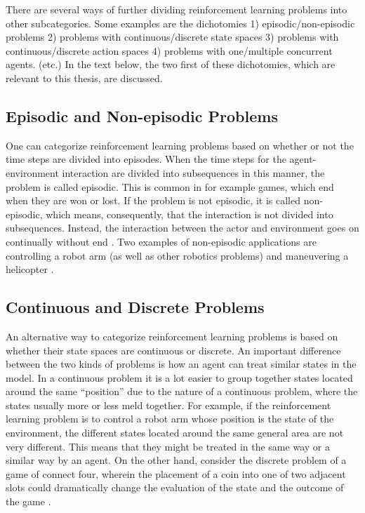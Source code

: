 There are several ways of further dividing reinforcement learning problems into other subcategories. Some examples are the dichotomies 1) episodic/non-episodic problems 2) problems with continuous/discrete state spaces 3) problems with continuous/discrete action spaces 4) problems with one/multiple concurrent agents. (etc.) In the text below, the two first of these dichotomies, which are relevant to this thesis, are discussed. 

\subsection{Episodic and Non-episodic Problems}
One can categorize reinforcement learning problems based on whether or not the time steps are divided into episodes. When the time steps for the agent-environment interaction are divided into subsequences in this manner, the problem is called episodic. This is common in for example games, which end when they are won or lost. If the problem is not episodic, it is called non-episodic, which means, consequently, that the interaction is not divided into subsequences. Instead, the interaction between the actor and environment goes on continually without end \parencite{barto1998reinforcement}. Two examples of non-episodic applications are controlling a robot arm (as well as other robotics problems) and maneuvering a helicopter \parencite{ng2006autonomous}. 

\subsection{Continuous and Discrete Problems}
An alternative way to categorize reinforcement learning problems is based on whether their state spaces are continuous or discrete. An important difference between the two kinds of problems is how an agent can treat similar states in the model. In a continuous problem it is a lot easier to group together states located around the same ``position'' due to the nature of a continuous problem, where the states usually more or less meld together. For example, if the reinforcement learning problem is to control a robot arm whose position is the state of the environment, the different states located around the same general area are not very different. This means that they might be treated in the same way or a similar way by an agent. On the other hand, consider the discrete problem of a game of connect four, wherein the placement of a coin into one of two adjacent slots could dramatically change the evaluation of the state and the outcome of the game \parencite{barto1998reinforcement}.